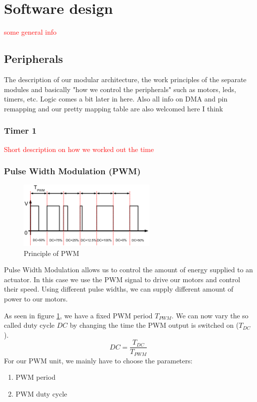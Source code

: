\section{Software design}
\textcolor{red}{some general info}

\subsection{Peripherals} %
The description of our modular architecture, the work principles of the separate modules and basically "how we control the peripherals" such as motors, leds, timers, etc. Logic comes a bit later in here.
Also all info on DMA and pin remapping and our pretty mapping table are also welcomed here I think

\subsubsection*{Timer 1}
\textcolor{red}{
Short description on how we worked out the time
}

\subsubsection*{Pulse Width Modulation (PWM)}

\begin{figure}[htb]
    \centering
    \includegraphics[width=0.6\textwidth]{figures/software/pwm_demo.png}
    \caption {Principle of PWM \cite{alex}}
    \label{fig:pwm_demo}
\end{figure}

Pulse Width Modulation allows us to control the amount of energy supplied to an actuator. In this case we use the PWM signal to drive our motors and control their speed. Using different pulse widths, we can supply different amount of power to our motors. \cite{alex}


As seen in figure \ref{fig:pwm_demo}, we have a fixed PWM period $T_{PWM}$. We can now vary the so called duty cycle $DC$ by changing the time the PWM output is switched on ($T_{DC}$).
\begin{equation}
    DC = \frac{T_{DC}}{T_{PWM}}
\end{equation}
For our PWM unit, we mainly have to choose the parameters:
\begin{enumerate}
    \item PWM period
    \item PWM duty cycle
\end{enumerate}


